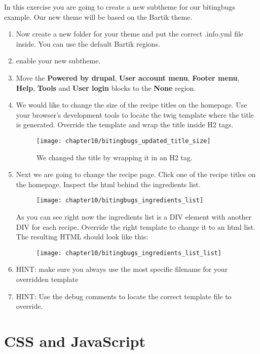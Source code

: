 In this exercise you are going to create a new subtheme for our bitingbugs example. Our new theme will be based on the Bartik theme.
\begin{enumerate}
	\item Now create a new folder for your theme and put the correct .info.yml file inside. You can use the default Bartik regions.
	\item enable your new subtheme.
	\item Move the \textbf{Powered by drupal}, \textbf{User account menu}, \textbf{Footer menu}, \textbf{Help}, \textbf{Tools} and \textbf{User login} blocks to the \textbf{None} region.
	\item We would like to change the size of the recipe titles on the homepage. Use your browser's development tools to locate the twig template where the title is generated. Override the template and wrap the title inside H2 tags.
	\begin{figure}[H]
		\centering
		\texttt{[image: chapter10/bitingbugs\_updated\_title\_size]}
		\caption{We changed the title by wrapping it in an H2 tag.}
		\label{fig:bitingbugs_updated_title_size}
	\end{figure}
	\item Next we are going to change the recipe page. Click one of the recipe titles on the homepage. Inspect the html behind the ingredients list. 
	\begin{figure}[H]
		\centering
		\texttt{[image: chapter10/bitingbugs\_ingredients\_list]}
		\label{fig:bitingbugs_ingredients_list}
	\end{figure}
	As you can see right now the ingredients list is a DIV element with another DIV for each recipe. Override the right template to change it to an html list. The resulting HTML should look like this:
	\begin{figure}[H]
		\centering
		\texttt{[image: chapter10/bitingbugs\_ingredients\_list\_list]}
		\label{fig:bitingbugs_ingredients_list_list}
	\end{figure}
	\item HINT: make sure you always use the most specific filename for your overridden template
	\item HINT: Use the debug comments to locate the correct template file to override.
\end{enumerate}


\section{CSS and JavaScript}

